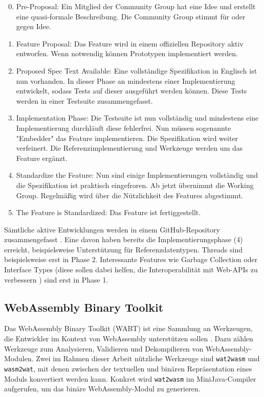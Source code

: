 \begin{enumerate}
    \setcounter{enumi}{-1}
    \item Pre-Proposal: Ein Mitglied der Community Group hat eine Idee und erstellt eine quasi-formale Beschreibung. Die Community Group stimmt für oder gegen Idee.
    \item Feature Proposal: Das Feature wird in einem offiziellen Repository aktiv entworfen. Wenn notwendig können Prototypen implementiert werden.
    \item Proposed Spec Text Available: Eine vollständige Spezifikation in Englisch ist nun vorhanden. In dieser Phase an mindestens einer Implementierung entwickelt, sodass Tests auf dieser ausgeführt werden können. Diese Tests werden in einer Testsuite zusammengefasst.
    \item Implementation Phase: Die Testsuite ist nun vollständig und mindestens eine Implementierung durchläuft diese fehlerfrei. Nun müssen sogenannte "Embedder" das Feature implementieren. Die Spezifikation wird weiter verfeinert. Die Referenzimplementierung und Werkzeuge werden um das Feature ergänzt.
    \item Standardize the Feature: Nun sind einige Implementierungen vollständig und die Spezifikation ist praktisch eingefroren. Ab jetzt übernimmt die Working Group. Regelmäßig wird über die Nützlichkeit des Features abgestimmt.
    \item The Feature is Standardized: Das Feature ist fertiggestellt.
\end{enumerate}

Sämtliche aktive Entwicklungen werden in einem GitHub-Repository zusammengefasst \cite{WebAssemblyProposals}.
Eine davon haben bereits die Implementierungsphase (4) erreicht, beispielsweise Unterstützung für Referenzdatentypen. Threads sind beispielsweise erst in Phase 2. Interessante Features wie Garbage Collection oder Interface Types (diese sollen dabei helfen, die Interoperabilität mit Web-APIs zu verbessern \cite{WebAssemblyInterfaceTypes}) sind erst in Phase 1.

\subsection{WebAssembly Binary Toolkit}
Das WebAssembly Binary Toolkit (WABT) ist eine Sammlung an Werkzeugen, die Entwickler im Kontext von WebAssembly unterstützen sollen \cite{WABT}. Dazu zählen Werkzeuge zum Analysieren, Validieren und Dekompilieren von WebAssembly-Modulen. Zwei im Rahmen dieser Arbeit nützliche Werkzeuge sind \lstinline{wat2wasm} und \lstinline{wasm2wat}, mit denen zwischen der textuellen und binären Repräsentation eines Moduls konvertiert werden kann. Konkret wird \lstinline{wat2wasm} im MiniJava-Compiler aufgerufen, um das binäre WebAssembly-Modul zu generieren.

